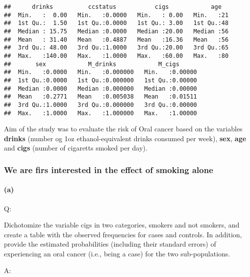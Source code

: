 \documentclass[
]{article}
\begin{document}
\begin{verbatim}
##      drinks          ccstatus           cigs            age    
##  Min.   :  0.00   Min.   :0.0000   Min.   : 0.00   Min.   :21  
##  1st Qu.:  1.50   1st Qu.:0.0000   1st Qu.: 3.00   1st Qu.:48  
##  Median : 15.75   Median :0.0000   Median :20.00   Median :56  
##  Mean   : 31.40   Mean   :0.4887   Mean   :16.36   Mean   :56  
##  3rd Qu.: 48.00   3rd Qu.:1.0000   3rd Qu.:20.00   3rd Qu.:65  
##  Max.   :140.00   Max.   :1.0000   Max.   :60.00   Max.   :80  
##       sex            M_drinks            M_cigs       
##  Min.   :0.0000   Min.   :0.000000   Min.   :0.00000  
##  1st Qu.:0.0000   1st Qu.:0.000000   1st Qu.:0.00000  
##  Median :0.0000   Median :0.000000   Median :0.00000  
##  Mean   :0.2771   Mean   :0.005038   Mean   :0.01511  
##  3rd Qu.:1.0000   3rd Qu.:0.000000   3rd Qu.:0.00000  
##  Max.   :1.0000   Max.   :1.000000   Max.   :1.00000
\end{verbatim}

Aim of the study was to evaluate the risk of Oral cancer based on the
variables \textbf{drinks} (number og 1oz ethanol-equivalent drinks
consumed per week), \textbf{sex}, \textbf{age} and \textbf{cigs} (number
of cigaretts smoked per day).

\hypertarget{we-are-firs-interested-in-the-effect-of-smoking-alone}{%
\subsubsection{We are firs interested in the effect of smoking
alone}\label{we-are-firs-interested-in-the-effect-of-smoking-alone}}

\hypertarget{a-1}{%
\paragraph{(a)}\label{a-1}}

Q:

Dichotomize the variable cigs in two categories, smokers and not
smokers, and create a table with the observed frequencies for cases and
controls. In addition, provide the estimated probabilities (including
their standard errors) of experiencing an oral cancer (i.e., being a
case) for the two sub-populations.

A:
\end{document}
